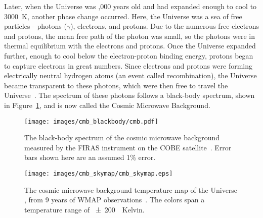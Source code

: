 Later, when the Universe was ,000 years old and had expanded enough to cool to \nicetilde\SI{3000}{K}, another phase change occurred.
Here, the Universe was a sea of free particles - photons ($\gamma$), electrons, and protons.
Due to the numerous free electrons and protons, the mean free path of the photon was small, so the photons were in thermal equilibrium with the electrons and protons.
Once the Universe expanded further, enough to cool below the electron-proton binding energy, protons began to capture electrons in great numbers.
Since electrons and protons were forming electrically neutral hydrogen atoms (an event called recombination), the Universe became transparent to these photons, which were then free to travel the Universe~\cite{planck2015,theEarlyUniverse,CMBFundamentals,CMBFlat}.
The spectrum of these photons follows a black-body spectrum, shown in Figure~\ref{fig:cmb_black}, and is now called the Cosmic Microwave Background.

\begin{figure}[!t]
  \centering
  \texttt{[image: images/cmb\_blackbody/cmb.pdf]}
  \caption[Cosmic Microwave Background Black-body Radiation]{
    The black-body spectrum of the cosmic microwave background measured by the FIRAS instrument on the COBE satellite~\cite{mather1990}.
    Error bars shown here are an assumed 1\% error.
  }
  \label{fig:cmb_black}
\end{figure}

\begin{figure}[ht]
  \centering
  \texttt{[image: images/cmb\_skymap/cmb\_skymap.eps]}
  \caption[Cosmic Microwave Background Sky Map]{
    The cosmic microwave background temperature map of the Universe \cite{wmap_skymap}, from 9 years of WMAP observations~\cite{wmap9year}.
    The colors span a temperature range of \SI{\pm200}{\mu{}Kelvin}.
  }
  \label{fig:cmb}
\end{figure}

